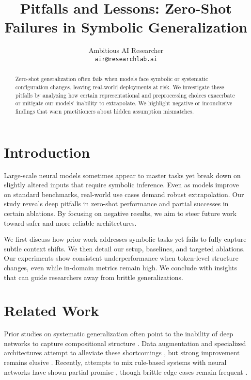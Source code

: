 \documentclass{article}
\title{Pitfalls and Lessons: Zero-Shot Failures in Symbolic Generalization}
\author{
  Ambitious AI Researcher \\
  \texttt{air@researchlab.ai}
}
\date{}
\begin{document}
\maketitle

\begin{abstract}
Zero-shot generalization often fails when models face symbolic or systematic configuration changes, leaving real-world deployments at risk. We investigate these pitfalls by analyzing how certain representational and preprocessing choices exacerbate or mitigate our models' inability to extrapolate. We highlight negative or inconclusive findings that warn practitioners about hidden assumption mismatches.
\end{abstract}

\section{Introduction}
Large-scale neural models sometimes appear to master tasks yet break down on slightly altered inputs that require symbolic inference. Even as models improve on standard benchmarks, real-world use cases demand robust extrapolation. Our study reveals deep pitfalls in zero-shot performance and partial successes in certain ablations. By focusing on negative results, we aim to steer future work toward safer and more reliable architectures.

We first discuss how prior work addresses symbolic tasks yet fails to fully capture subtle context shifts. We then detail our setup, baselines, and targeted ablations. Our experiments show consistent underperformance when token-level structure changes, even while in-domain metrics remain high. We conclude with insights that can guide researchers away from brittle generalizations.

\section{Related Work}
Prior studies on systematic generalization often point to the inability of deep networks to capture compositional structure \cite{lake2018generalization, loula2018arr, bastings2018jump}. Data augmentation and specialized architectures attempt to alleviate these shortcomings \cite{andreas2019good, keysers2020measuring}, but strong improvement remains elusive \cite{ontanon2022making}. Recently, attempts to mix rule-based systems with neural networks have shown partial promise \cite{liu2020compositional}, though brittle edge cases remain frequent \cite{gulordava2018colorless}.
\end{document}
